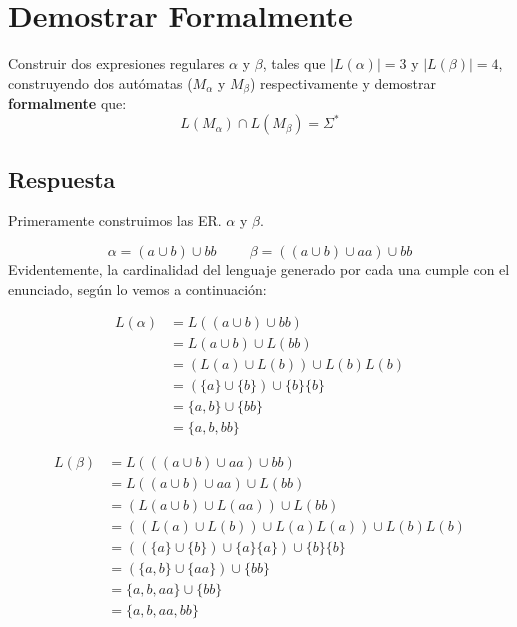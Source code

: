 \section*{Demostrar Formalmente}

 Construir dos expresiones regulares $\alpha$ y $\beta$, tales que $|L(\alpha)|=3$ y $|L(\beta)|=4$, construyendo dos autómatas ($M_\alpha$ y $M_\beta$) respectivamente y demostrar \textbf{formalmente} que: $$L(M_\alpha)\cap L(M_\beta)=\Sigma^*$$
\subsection*{Respuesta}
Primeramente construimos las ER. $\alpha$ y $\beta$.

$$ 
\alpha = (a\cup b) \cup bb \hspace{1cm} \beta =  ((a\cup b) \cup aa)\cup bb  
$$
Evidentemente, la cardinalidad del lenguaje generado por cada una cumple con el enunciado, según lo vemos a continuación:\\
\noindent
\begin{minipage}[t]{.5\textwidth}
\raggedright

\begin{align*}
L(\alpha) &= L( (a\cup b)\cup bb) \\
		  &= L(a\cup b)\cup L(bb) \\
		  &= (L(a)\cup L(b))\cup L(b)L(b) \\
		  &= (\{ a\}\cup \{ b \})\cup \{b\}\{b\} \\
		  &= \{a,b \}\cup \{bb\} \\
		  &= \{a,b,bb \}
\end{align*}
\hspace{0.5cm}
\end{minipage}%
\begin{minipage}[t]{.5\textwidth}
\raggedright
\begin{align*}
L(\beta)  &= L( ((a\cup b) \cup aa)\cup bb  )\\
		  &= L( (a\cup b) \cup aa)\cup L(bb) \\
		  &= (L( a\cup b) \cup L(aa))\cup L(bb) \\
		  &= (( L(a)\cup L(b)) \cup L(a)L(a))\cup L(b)L(b) \\
		  &= ((\{a\}\cup\{b\})\cup\{a\}\{a\})\cup \{b\}\{b\} \\
		  & = (\{a,b\}\cup\{aa\})\cup\{bb\} \\
		  & = \{a,b,aa\}\cup\{bb\} \\
		  & = \{a,b,aa,bb\}
\end{align*}
\hspace{0.5cm}
\end{minipage}

